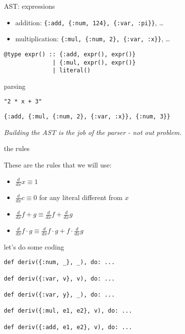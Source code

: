 \begin{frame}[fragile]{AST: expressions}

  \begin{itemize}
  \item addition: {\tt \{:add, \{:num, 124\}, \{:var, :pi\}\}}, \ldots \pause
  \item multiplication: {\tt \{:mul, \{:num, 2\}, \{:var, :x\}\}}, \ldots 
  \end{itemize}
  
  
  \vspace{20pt}  \pause
  
\begin{verbatim}
@type expr() :: {:add, expr(), expr()} 
              | {:mul, expr(), expr()} 
              | literal()
\end{verbatim}  
  
\end{frame}

\begin{frame}[fragile]{parsing}

  {\tt "2 * x + 3"}

  \vspace{20pt}\pause

  {\tt \{:add, \{:mul, \{:num, 2\}, \{:var, :x\}\}, \{:num, 3\}\}}

  \vspace{20pt}\pause
  {\em Building the AST is the job of the parser - not out problem.}

\end{frame}

\begin{frame}{the rules}

  These are the rules that we will use:
  \vspace{20pt}\pause  

\begin{itemize}
\item $\frac{d}{dx} x \equiv 1$ \pause
\item $\frac{d}{dx} c \equiv 0$  for any literal different from $x$ \pause
\item $\frac{d}{dx} f + g \equiv  \frac{d}{dx} f + \frac{d}{dx} g$ \pause
\item $\frac{d}{dx} f \cdot g \equiv  \frac{d}{dx} f \cdot  g + f \cdot \frac{d}{dx} g$ \pause
\end{itemize}

\end{frame}

\begin{frame}[fragile]{let's do some coding}

\begin{verbatim}
def deriv({:num, _}, _), do: ...

def deriv({:var, v}, v), do: ...

def deriv({:var, y}, _), do: ...

def deriv({:mul, e1, e2}, v), do: ...

def deriv({:add, e1, e2}, v), do: ...
\end{verbatim}

\end{frame}




